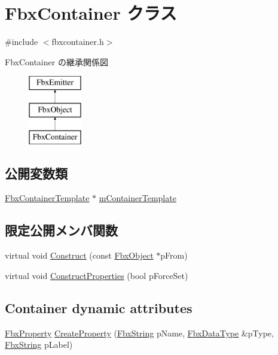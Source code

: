 \hypertarget{class_fbx_container}{}\section{Fbx\+Container クラス}
\label{class_fbx_container}


{\ttfamily \#include $<$fbxcontainer.\+h$>$}

Fbx\+Container の継承関係図\begin{figure}[H]
\begin{center}
\leavevmode
\includegraphics[height=3.000000cm]{class_fbx_container}
\end{center}
\end{figure}
\subsection*{公開変数類}
\begin{DoxyCompactItemize}
\item 
\hyperlink{class_fbx_container_template}{Fbx\+Container\+Template} $\ast$ \hyperlink{class_fbx_container_ade609786f173965289c16e2537927bd8}{m\+Container\+Template}
\end{DoxyCompactItemize}
\subsection*{限定公開メンバ関数}
\begin{DoxyCompactItemize}
\item 
virtual void \hyperlink{class_fbx_container_a65204439a64fd2184467e41d994bec0a}{Construct} (const \hyperlink{class_fbx_object}{Fbx\+Object} $\ast$p\+From)
\item 
virtual void \hyperlink{class_fbx_container_a27222c85d2076c036d1596c25cbc9cd0}{Construct\+Properties} (bool p\+Force\+Set)
\end{DoxyCompactItemize}
\subsection*{Container dynamic attributes}
\begin{DoxyCompactItemize}
\item 
\hyperlink{class_fbx_property}{Fbx\+Property} \hyperlink{class_fbx_container_aba24a2e2319b0111980eb198f8e726b1}{Create\+Property} (\hyperlink{class_fbx_string}{Fbx\+String} p\+Name, \hyperlink{class_fbx_data_type}{Fbx\+Data\+Type} \&p\+Type, \hyperlink{class_fbx_string}{Fbx\+String} p\+Label)
\end{DoxyCompactItemize}
